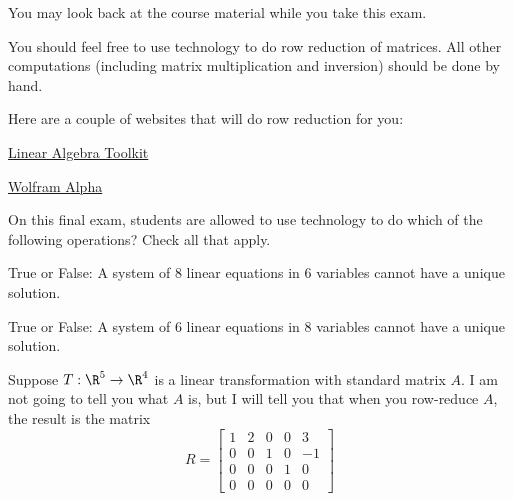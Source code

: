 




You may look back at the course material while you take this exam.  

You should feel free to use technology to do row reduction of matrices.  All other computations (including matrix multiplication and inversion) should be done by hand.  

Here are a couple of websites that will do row reduction for you:

\href{https://tinyurl.com/dmokjt}{Linear Algebra Toolkit}

\href{https://www.wolframalpha.com/}{Wolfram Alpha}



\endedxtext


On this final exam, students are allowed to use technology to do which of the following operations?  Check all that apply.  



\endedxproblem


\endedxvertical






True or False: A system of 8 linear equations in 6 variables cannot have a unique solution.  


True or False: A system of 6 linear equations in 8 variables cannot have a unique solution.  



\edXsolution{ 

}

\endedxproblem






Suppose $T: \R^5 \rightarrow \R^4$ is a linear transformation with standard matrix $A$.  I am not going to tell you what $A$ is,
but I will tell you that when you row-reduce $A$, the result is the matrix
\[R = 
\left[ \begin{array}{ccccc}    
1 & 2 & 0 & 0 & 3 \\
0 & 0 & 1 & 0 & -1 \\
0 & 0 & 0 & 1 & 0 \\
0 & 0 & 0 & 0 & 0
\end{array}
\right]
 \]

